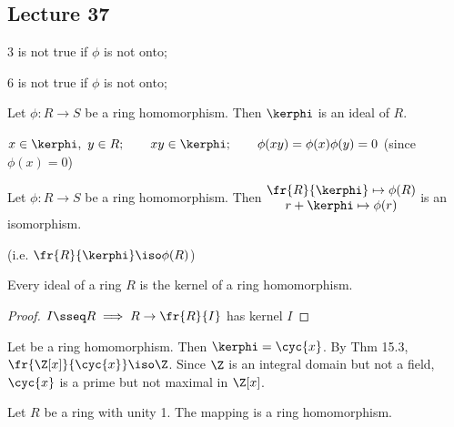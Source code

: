 \documentclass[a4paper]{article}
\begin{document}
\subsection*{Lecture 37} %

\begin{note}
  3 is not true if \( \phi \) is not onto; 

  6 is not true if \( \phi \) is not onto; 
\end{note}

\begin{theorem}
  Let \( \phi:R\to S \) be a ring homomorphism. Then \( \kerphi \) is an ideal of \( R \).
  \begin{note}
    \( x\in\kerphi,\ y\in R; \qquad xy\in\kerphi; \qquad \phi(xy)=\phi(x)\phi(y) = 0\) (since \( \phi(x)=0 \))
  \end{note}
\end{theorem}

\begin{theorem}
  Let \( \phi:R\to S \) be a ring homomorphism. Then \( \begin{matrix}
    \fr{R}{\kerphi} \mapsto \phi(R) \\
    r + \kerphi \mapsto \phi(r)
  \end{matrix} \) is an isomorphism.

  (i.e. \( \fr{R}{\kerphi} \iso \phi(R) \))
\end{theorem}

\begin{theorem}
  Every ideal of a ring \( R \) is the kernel of a ring homomorphism.
\end{theorem}

\begin{proof}
  \( I\sseq R\implies R\to\fr{R}{I} \) has kernel \( I \)
\end{proof}

\begin{example}
  Let  be a ring homomorphism. Then \( \kerphi = \cyc{x} \). By Thm 15.3, \( \fr{\Z[x]}{\cyc{x}}\iso\Z \). Since \( \Z \) is an integral domain but not a field, \( \cyc{x} \) is a prime but not maximal in \( \Z[x] \).
\end{example}

\begin{theorem}
  Let \( R \) be a ring with unity 1. The mapping  is a ring homomorphism.
\end{theorem}
\end{document}
